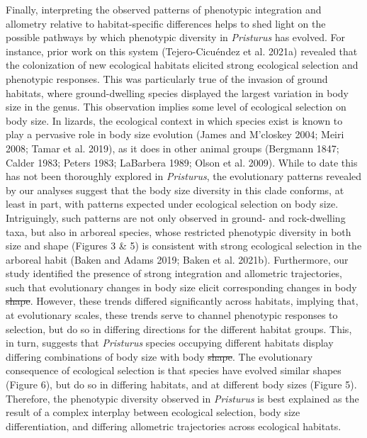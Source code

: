 \documentclass[
  11pt,
]{article}
\providecommand{\DIFaddtex}[1]{{\protect\color{blue}\uwave{#1}}} %
\providecommand{\DIFdeltex}[1]{{\protect\color{red}\sout{#1}}}                      %
\providecommand{\DIFaddbegin}{} %
\providecommand{\DIFaddend}{} %
\providecommand{\DIFdelbegin}{} %
\providecommand{\DIFdelend}{} %
\providecommand{\DIFadd}[1]{\texorpdfstring{\DIFaddtex{#1}}{#1}} %
\providecommand{\DIFdel}[1]{\texorpdfstring{\DIFdeltex{#1}}{}} %
\newcommand{\DIFscaledelfig}{0.5}
\newlength{\DIFdelgraphicswidth} %
\newlength{\DIFdelgraphicsheight} %
\newcommand{\DIFaddincludegraphics}[2][]{{\color{blue}\fbox{\DIFOincludegraphics[#1]{#2}}}} %
\newcommand{\DIFdelincludegraphics}[2][]{%
\sbox{\DIFdelgraphicsbox}{\DIFOincludegraphics[#1]{#2}}%
\settoboxwidth{\DIFdelgraphicswidth}{\DIFdelgraphicsbox} %
\settoboxtotalheight{\DIFdelgraphicsheight}{\DIFdelgraphicsbox} %
\scalebox{\DIFscaledelfig}{%
\parbox[b]{\DIFdelgraphicswidth}{\usebox{\DIFdelgraphicsbox}\\[-\baselineskip] \rule{\DIFdelgraphicswidth}{0em}}\llap{\resizebox{\DIFdelgraphicswidth}{\DIFdelgraphicsheight}{%
\setlength{\unitlength}{\DIFdelgraphicswidth}%
\begin{picture}(1,1)%
\thicklines\linethickness{2pt} %
{\color[rgb]{1,0,0}\put(0,0){\framebox(1,1){}}}%
{\color[rgb]{1,0,0}\put(0,0){\line( 1,1){1}}}%
{\color[rgb]{1,0,0}\put(0,1){\line(1,-1){1}}}%
\end{picture}%
}\hspace*{3pt}}} %
} %
\DeclareRobustCommand{\DIFaddbegin}{\DIFOaddbegin \let\includegraphics\DIFaddincludegraphics} %
\DeclareRobustCommand{\DIFaddend}{\DIFOaddend \let\includegraphics\DIFOincludegraphics} %
\DeclareRobustCommand{\DIFdelbegin}{\DIFOdelbegin \let\includegraphics\DIFdelincludegraphics} %
\DeclareRobustCommand{\DIFdelend}{\DIFOaddend \let\includegraphics\DIFOincludegraphics} %
\begin{document}
Finally, interpreting the observed patterns of phenotypic integration
and allometry relative to habitat-specific differences helps to shed
light on the possible pathways by which phenotypic diversity in
\emph{Pristurus} has evolved. For instance, prior work on this system
(Tejero-Cicuéndez et al. 2021a) revealed that the colonization of new
ecological habitats elicited strong ecological selection and phenotypic
responses. This was particularly true of the invasion of ground
habitats, where ground-dwelling species displayed the largest variation
in body size in the genus. This observation implies some level of
ecological selection on body size. In lizards, the ecological context in
which species exist is known to play a pervasive role in body size
evolution (James and M'closkey 2004; Meiri 2008; Tamar et al. 2019), as
it does in other animal groups (Bergmann 1847; Calder 1983; Peters 1983;
LaBarbera 1989; Olson et al. 2009). While to date this has not been
thoroughly explored in \emph{Pristurus}, the evolutionary patterns
revealed by our analyses suggest that the body size diversity in this
clade conforms, at least in part, with patterns expected under
ecological selection on body size. Intriguingly, such patterns are not
only observed in ground- and rock-dwelling taxa, but also in arboreal
species, whose restricted phenotypic diversity in both size and shape
(Figures 3 \& 5) is consistent with strong ecological selection in the
arboreal habit (Baken and Adams 2019; Baken et al. 2021b). Furthermore,
our study identified the presence of strong integration and allometric
trajectories, such that evolutionary changes in body size elicit
corresponding changes in body \DIFdelbegin \DIFdel{shape}\DIFdelend \DIFaddbegin \DIFadd{form}\DIFaddend . However, these trends differed
significantly across habitats, implying that, at evolutionary scales,
these trends serve to channel phenotypic responses to selection, but do
so in differing directions for the different habitat groups. This, in
turn, suggests that \emph{Pristurus} species occupying different
habitats display differing combinations of body size with body \DIFdelbegin \DIFdel{shape}\DIFdelend \DIFaddbegin \DIFadd{form}\DIFaddend . The
evolutionary consequence of ecological selection is that species have
evolved similar shapes (Figure 6), but do so in differing habitats, and
at different body sizes (Figure 5). Therefore, the phenotypic diversity
observed in \emph{Pristurus} is best explained as the result of a
complex interplay between ecological selection, body size
differentiation, and differing allometric trajectories across ecological
habitats.
\end{document}

